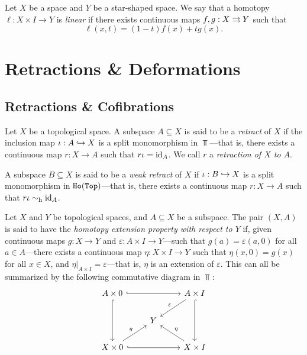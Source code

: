 \begin{definition}
\label{def:linear-homotopy}
Let \(X\) be a space and \(Y\) be a star-shaped space. We say that a homotopy
\(\ell: X \times I \to Y\) is \emph{linear} if there exists continuous maps
\(f, g: X \rightrightarrows Y\) such that
\[
\ell(x, t) = (1 - t) f(x) + t g(x).
\]
\end{definition}

\section{Retractions \& Deformations}

\subsection{Retractions \& Cofibrations}

\begin{definition}[Retract]
\label{def:retract}
Let \(X\) be a topological space. A subspace \(A \subseteq X\) is said to be a
\emph{retract} of \(X\) if the inclusion map \(\iota: A \hookrightarrow X\) is a split
monomorphism in \(\Top\)---that is, there exists a continuous map
\(r: X \to A\) such that \(r \iota = \operatorname{id}_A\). We call \(r\) a \emph{retraction
  of \(X\) to \(A\)}.

A subspace \(B \subseteq X\) is said to be a \emph{weak retract} of \(X\) if
\(\iota: B \hookrightarrow X\) is a split monomorphism in \({\texttt{Ho}(\texttt{Top})}\)---that is, there
exists a continuous map \(r: X \to A\) such that \(r \iota \sim_{\text{h}} \operatorname{id}_A\).
\end{definition}

\begin{definition}
\label{def:homotopy-extension-property}
Let \(X\) and \(Y\) be topological spaces, and \(A \subseteq X\) be a
subspace. The pair \((X, A)\) is said to have the \emph{homotopy extension
  property with respect to \(Y\)} if, given continuous maps \(g: X \to Y\) and
\(\varepsilon: A \times I \to Y\)---such that \(g(a) = \varepsilon(a, 0)\) for
all \(a \in A\)---there exists a continuous map \(\eta: X \times I \to Y\) such
that \(\eta(x, 0) = g(x)\) for all \(x \in X\), and
\(\eta|_{A \times I} = \varepsilon\)---that is, \(\eta\) is an extension of
\(\varepsilon\). This can all be summarized by the following commutative diagram
in \(\Top\):
\[
\begin{tikzcd}
A \times 0 \ar[rr, hook] \ar[dd, hook]
& &A \times I \ar[dd, hook] \ar[ld, "\varepsilon"'] \\
&Y & \\
X \times 0 \ar[rr, hook] \ar[ru, "g"]
& &X \times I \ar[lu, "\eta"']
\end{tikzcd}
\]
\end{definition}

